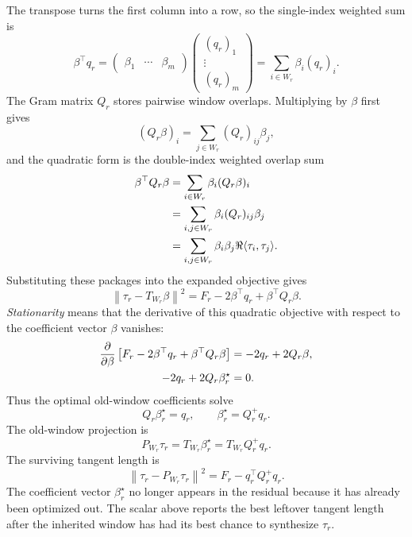\documentclass[10pt,twocolumn]{article}
\begin{document}
The transpose turns the first column into a row, so the single-index weighted sum is
\begin{equation}
\beta^\top q_r
=
\begin{pmatrix}\beta_1&\cdots&\beta_m\end{pmatrix}
\begin{pmatrix}(q_r)_1\\[-1mm]\vdots\\[-1mm](q_r)_m\end{pmatrix}
=\sum_{i\in W_r}\beta_i(q_r)_i.
\label{eq:p1_dot_product}
\end{equation}
The Gram matrix \(Q_r\) stores pairwise window overlaps. Multiplying by \(\beta\) first gives
\begin{equation}
(Q_r\beta)_i=\sum_{j\in W_r}(Q_r)_{ij}\beta_j,
\label{eq:p1_matrix_vector}
\end{equation}
and the quadratic form is the double-index weighted overlap sum
\begin{align}
\beta^\top Q_r\beta
&=\sum_{i\in W_r}\beta_i(Q_r\beta)_i
\notag\\
&=\sum_{i,j\in W_r}\beta_i(Q_r)_{ij}\beta_j
\notag\\
&=\sum_{i,j\in W_r}\beta_i\beta_j\Re\langle\tau_i,\tau_j\rangle .
\label{eq:p1_quadratic_form}
\end{align}
Substituting these packages into the expanded objective gives
\begin{equation}
\left\|\tau_r-T_{W_r}\beta\right\|^2
=F_r-2\beta^\top q_r+\beta^\top Q_r\beta.
\label{eq:p1_expand}
\end{equation}
\emph{Stationarity} means that the derivative of this quadratic objective with respect to the coefficient vector \(\beta\) vanishes:
\begin{align}
\frac{\partial}{\partial\beta}
\left[
F_r-2\beta^\top q_r+\beta^\top Q_r\beta
\right]
&=-2q_r+2Q_r\beta,
\notag\\
-2q_r+2Q_r\beta_r^\star&=0.
\label{eq:p1_stationarity_derivative}
\end{align}
Thus the optimal old-window coefficients solve
\begin{equation}
Q_r\beta_r^\star=q_r,
\qquad
\beta_r^\star=Q_r^+q_r.
\label{eq:p1_normal}
\end{equation}
The old-window projection is
\begin{equation}
P_{W_r}\tau_r=T_{W_r}\beta_r^\star
=T_{W_r}Q_r^+q_r.
\label{eq:p1_projection}
\end{equation}
The surviving tangent length is
\begin{equation}
\left\|\tau_r-P_{W_r}\tau_r\right\|^2
=F_r-q_r^\top Q_r^+q_r.
\label{eq:p1_residual}
\end{equation}
The coefficient vector \(\beta_r^\star\) no longer appears in the residual because it has already been optimized out. The scalar above reports the best leftover tangent length after the inherited window has had its best chance to synthesize \(\tau_r\).
\end{document}
